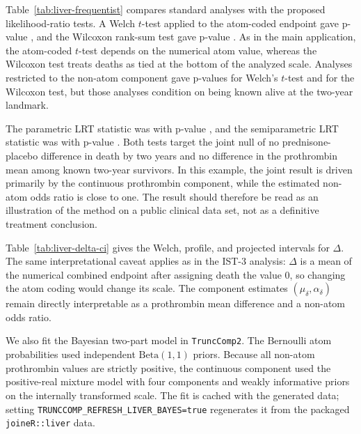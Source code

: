 \documentclass[11pt]{article}
\begin{document}
Table~\ref{tab:liver-frequentist} compares standard analyses with the proposed likelihood-ratio tests. A Welch $t$-test applied to the atom-coded endpoint gave p-value \LiverAppendixTTestP{}, and the Wilcoxon rank-sum test gave p-value \LiverAppendixWilcoxP{}. As in the main application, the atom-coded $t$-test depends on the numerical atom value, whereas the Wilcoxon test treats deaths as tied at the bottom of the analyzed scale. Analyses restricted to the non-atom component gave p-values \LiverAppendixNonAtomTTestP{} for Welch's $t$-test and \LiverAppendixNonAtomWilcoxP{} for the Wilcoxon test, but those analyses condition on being known alive at the two-year landmark.



The parametric LRT statistic was \LiverAppendixLRTStatistic{} with p-value \LiverAppendixLRTP{}, and the semiparametric LRT statistic was \LiverAppendixSPLRTStatistic{} with p-value \LiverAppendixSPLRTP{}. Both tests target the joint null of no prednisone-placebo difference in death by two years and no difference in the prothrombin mean among known two-year survivors. In this example, the joint result is driven primarily by the continuous prothrombin component, while the estimated non-atom odds ratio is close to one. The result should therefore be read as an illustration of the method on a public clinical data set, not as a definitive treatment conclusion.



Table~\ref{tab:liver-delta-ci} gives the Welch, profile, and projected intervals for $\Delta$. The same interpretational caveat applies as in the IST-3 analysis: $\Delta$ is a mean of the numerical combined endpoint after assigning death the value 0, so changing the atom coding would change its scale. The component estimates $(\mu_\delta,\alpha_\delta)$ remain directly interpretable as a prothrombin mean difference and a non-atom odds ratio.

We also fit the Bayesian two-part model in \texttt{TruncComp2}. The Bernoulli atom probabilities used independent $\mathrm{Beta}(1,1)$ priors. Because all non-atom prothrombin values are strictly positive, the continuous component used the positive-real mixture model with four components and weakly informative priors on the internally transformed scale. The fit is cached with the generated data; setting \texttt{TRUNCCOMP\_REFRESH\_LIVER\_BAYES=true} regenerates it from the packaged \texttt{joineR::liver} data.
\end{document}
